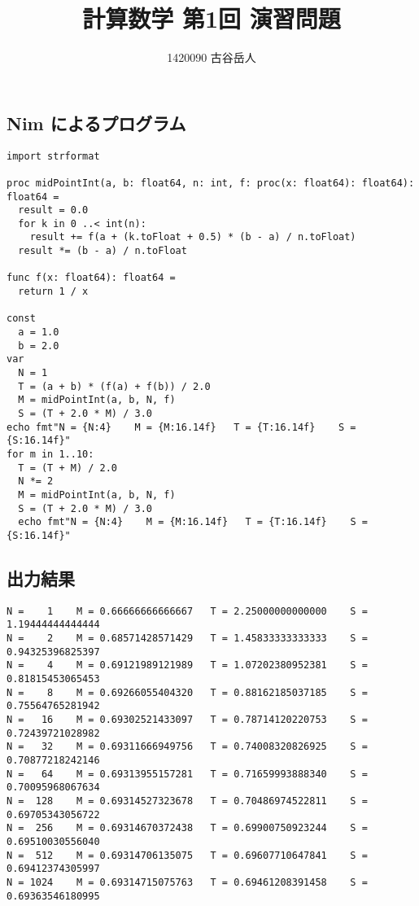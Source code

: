 \documentclass[uplatex,dvipdfmx,a4paper]{jsarticle}
\title{計算数学 第1回 演習問題}
\author{1420090 古谷岳人}
\begin{document}
  \maketitle
  \subsection*{Nim によるプログラム}
  \begin{verbatim}
import strformat

proc midPointInt(a, b: float64, n: int, f: proc(x: float64): float64): float64 =
  result = 0.0
  for k in 0 ..< int(n):
    result += f(a + (k.toFloat + 0.5) * (b - a) / n.toFloat)
  result *= (b - a) / n.toFloat

func f(x: float64): float64 =
  return 1 / x

const
  a = 1.0
  b = 2.0
var
  N = 1
  T = (a + b) * (f(a) + f(b)) / 2.0
  M = midPointInt(a, b, N, f)
  S = (T + 2.0 * M) / 3.0
echo fmt"N = {N:4}    M = {M:16.14f}   T = {T:16.14f}    S = {S:16.14f}"
for m in 1..10:
  T = (T + M) / 2.0
  N *= 2
  M = midPointInt(a, b, N, f)
  S = (T + 2.0 * M) / 3.0
  echo fmt"N = {N:4}    M = {M:16.14f}   T = {T:16.14f}    S = {S:16.14f}"
  \end{verbatim}

  \subsection*{出力結果}
  \begin{verbatim}
N =    1    M = 0.66666666666667   T = 2.25000000000000    S = 1.19444444444444
N =    2    M = 0.68571428571429   T = 1.45833333333333    S = 0.94325396825397
N =    4    M = 0.69121989121989   T = 1.07202380952381    S = 0.81815453065453
N =    8    M = 0.69266055404320   T = 0.88162185037185    S = 0.75564765281942
N =   16    M = 0.69302521433097   T = 0.78714120220753    S = 0.72439721028982
N =   32    M = 0.69311666949756   T = 0.74008320826925    S = 0.70877218242146
N =   64    M = 0.69313955157281   T = 0.71659993888340    S = 0.70095968067634
N =  128    M = 0.69314527323678   T = 0.70486974522811    S = 0.69705343056722
N =  256    M = 0.69314670372438   T = 0.69900750923244    S = 0.69510030556040
N =  512    M = 0.69314706135075   T = 0.69607710647841    S = 0.69412374305997
N = 1024    M = 0.69314715075763   T = 0.69461208391458    S = 0.69363546180995
  \end{verbatim}
\end{document}
